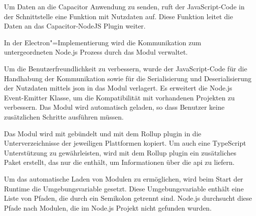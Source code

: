 Um Daten an die Capacitor Anwendung zu senden, ruft der JavaScript-Code in der Schnittstelle eine Funktion mit Nutzdaten auf.
Diese Funktion leitet die Daten an das Capacitor-NodeJS Plugin weiter.

In der Electron"=Implementierung wird die Kommunikation zum untergeordneten Node.js Prozess durch das  Modul verwaltet.

Um die Benutzerfreundlichkeit zu verbessern, wurde der JavaScript-Code für die Handhabung der Kommunikation sowie für die Serialisierung und Deserialisierung der Nutzdaten mittels \ac{json} in das  Modul verlagert.
Es erweitert die Node.js Event-Emitter Klasse, um die Kompatibilität mit vorhandenen Projekten zu verbessern.
Das Modul wird automatisch geladen, so dass Benutzer keine zusätzlichen Schritte ausführen müssen.

Das  Modul wird mit  gebündelt und mit dem Rollup plugin  in die Unterverzeichnisse der jeweiligen Plattformen kopiert.
Um auch eine TypeScript Unterstützung zu gewährleisten, wird mit dem Rollup plugin  ein zusätzliches Paket erstellt, das nur die  enthält, um Informationen über die \ac{api} zu liefern.

Um das automatische Laden von Modulen zu ermöglichen, wird beim Start der Runtime die Umgebungsvariable  gesetzt.
Diese Umgebungsvariable enthält eine Liste von Pfaden, die durch ein Semikolon getrennt sind.
Node.js durchsucht diese Pfade nach Modulen, die im Node.js Projekt nicht gefunden wurden.
\cite{nodejs-mobile:docs, nodejs}

\printfn
